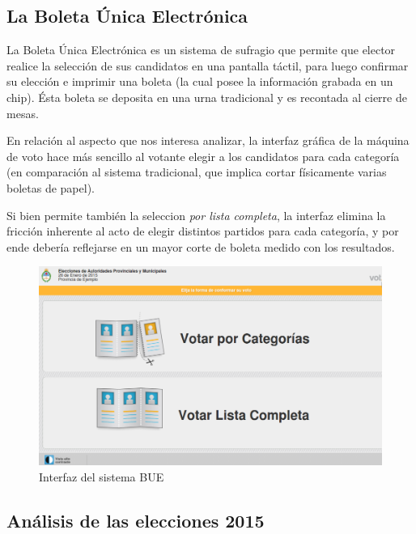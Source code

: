 \documentclass[12pt,a4paper]{article}
\begin{document}
\subsection{La Boleta Única Electrónica}
La Boleta Única Electrónica es un sistema de sufragio que permite que elector
realice la selección de sus candidatos en una pantalla táctil, para luego
confirmar su elección e imprimir una boleta (la cual posee la información
grabada en un chip). Ésta boleta se deposita en una urna tradicional y es
recontada al cierre de mesas.

En relación al aspecto que nos interesa analizar, la interfaz gráfica de la
máquina de voto hace más sencillo al votante elegir a los candidatos para cada
categoría (en comparación al sistema tradicional, que implica cortar físicamente
varias boletas de papel).

Si bien permite también la seleccion \emph{por lista completa}, la interfaz
elimina la fricción inherente al acto de elegir distintos partidos para cada
categoría, y por ende debería reflejarse en un mayor corte de boleta medido con
los resultados.

\begin{figure}[h]
\centering
    \includegraphics[width=\textwidth]{interfaz_bue}
\caption{Interfaz del sistema BUE}
\end{figure}

\subsection{Análisis de las elecciones 2015}
\end{document}
